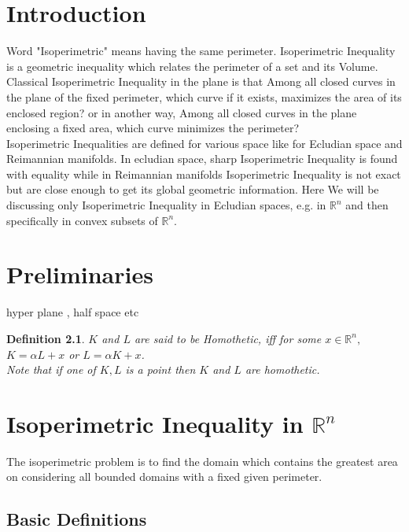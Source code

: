 \documentclass[oneside]{book}
\newtheorem{mydef}{Definition}
\begin{document}
\chapter{Introduction}
 Word "Isoperimetric" means having the same perimeter. Isoperimetric Inequality is a geometric inequality which relates the perimeter of a set and its Volume. Classical Isoperimetric Inequality in the plane is that Among all closed curves in the plane of the fixed perimeter, which curve if it exists, maximizes the area of its enclosed region? or in another way, Among all closed curves in the plane enclosing a fixed area, which curve minimizes the perimeter?\\
Isoperimetric Inequalities are defined for various space like for Ecludian space and Reimannian manifolds. In ecludian space, sharp Isoperimetric Inequality is found with equality while in Reimannian manifolds Isoperimetric Inequality is not exact but are close enough to get its global geometric information. Here We will be discussing only  Isoperimetric Inequality in Ecludian spaces, e.g. in  $\mathbb{R}^{n}$ and then specifically in convex subsets of $\mathbb{R}^{n}$.
\\


















\chapter{Preliminaries }
hyper plane , half space etc 
\begin{mydef}
$K$ and $L$ are said to be Homothetic, iff for some $x  \in \mathbb{R}^n,$ $K = \alpha L + x$ or $L=\alpha K+x $.\\
Note that if one of $K, L $ is a point then $K $ and $L$ are homothetic.
\end{mydef}
\label{def:2.1}
 \chapter{Isoperimetric Inequality in $\mathbb{R}^{n}$} 
 The isoperimetric problem is to find the domain which contains the greatest area on considering all bounded domains with a fixed given perimeter.

\section{\textbf{Basic Definitions}}
\end{document}
